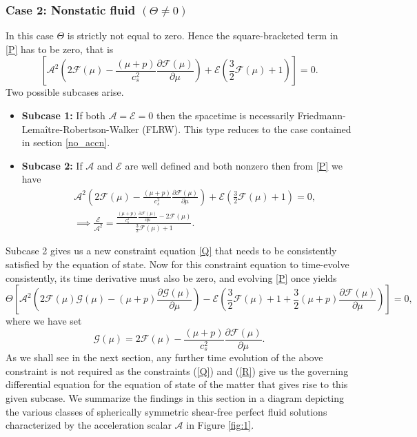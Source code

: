 \documentclass[abstract=on,notitlepage,superscriptaddress,nofootinbib,aps,preprint,prd]{revtex4}
\newcommand{\0}{^{(0)}}
\newcommand{\1}{^{(1)}}
\newcommand{\2}{^{(2)}}
\newcommand{\3}{{}^{(3)}}
\begin{document}
\subsubsection{Case 2: Nonstatic fluid $\left(\Theta \neq 0\right)$}
In this case $\Theta$ is strictly not equal to zero. Hence the square-bracketed term in \eqref{P} has to be zero, that is
\begin{equation}
    \left[\mathcal{A}^2\left(2\mathcal{F}(\mu)-\frac{(\mu+p)}{c_s^2}\frac{\partial \mathcal{F}(\mu)}{\partial \mu}\right)+\mathcal{E}\left(\frac{3}{2}\mathcal{F}(\mu)+1\right)\right]=0.
\end{equation}
Two possible subcases arise.
\begin{itemize}
	\item \textbf{Subcase 1:} 
	If both $\mathcal{A}=\mathcal{E}=0$ then the spacetime is necessarily Friedmann-Lema\^itre-Robertson-Walker (FLRW). This type reduces to the case contained in section \ref{no_accn}.
	\item \textbf{Subcase 2:} If $\mathcal{A}$ and $\mathcal{E}$ are well defined and both nonzero then from \eqref{P} we have
	 \begin{eqnarray}
	 	&&\mathcal{A}^2\left(2\mathcal{F}(\mu)-\frac{(\mu+p)}{c_s^2}\frac{\partial \mathcal{F}(\mu)}{\partial \mu}\right)+\mathcal{E}\left(\frac{3}{2}\mathcal{F}(\mu)+1\right)= 0, \nonumber \\
	 &&	\implies \frac{\mathcal{E}}{\mathcal{A}^2}= \frac{\frac{(\mu+p)}{c_s^2}\frac{\partial \mathcal{F}(\mu)}{\partial \mu}-2\mathcal{F}(\mu)}{\frac{3}{2}\mathcal{F}(\mu)+1}. \label{Q}
	 \end{eqnarray}
 \end{itemize}
Subcase 2 gives us a new constraint equation \eqref{Q} that needs to be consistently satisfied by the equation of state. Now for this constraint equation to time-evolve consistently, its time derivative must also be zero, and evolving \eqref{P} once yields
\begin{equation} 
	\Theta\left[\mathcal{A}^2\left(2\mathcal{F}(\mu)\mathcal{G}(\mu)-(\mu+p)\frac{\partial \mathcal{G}(\mu)}{\partial \mu}\right)- \mathcal{E}\left(\frac{3}{2}\mathcal{F}(\mu)+1+\frac{3}{2}(\mu+p)\frac{\partial \mathcal{F}(\mu)}{\partial \mu}\right)\right]=0, \label{R}
\end{equation}
where we have set
\begin{equation} 
	\mathcal{G}(\mu) = 2\mathcal{F}(\mu)-\frac{(\mu+p)}{c_s^2}\frac{\partial \mathcal{F}(\mu)}{\partial \mu}.
\end{equation}
As we shall see in the next section,  any further time evolution of the above constraint is not required as the constraints (\ref{Q}) and (\ref{R}) give us the governing differential equation for the equation of state of the matter that gives rise to this given subcase. We summarize the findings in this section in a diagram depicting the various classes of spherically symmetric shear-free perfect fluid solutions characterized by the acceleration scalar $\mathcal{A}$ in Figure \ref{fig:1}.
 
\end{document}

